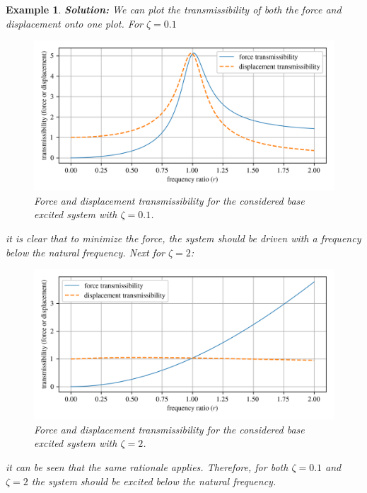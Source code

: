\documentclass[12pt,letter]{article}
\newtheorem{ex}{Example}
\numberwithin{ex}{section} %
\newenvironment{example}{\begin{mdframed}[middlelinewidth=0.5mm]\begin{ex}\normalfont}{\end{ex}\end{mdframed}}
\numberwithin{re}{section} %
\numberwithin{vcs}{section} %
\begin{document}
\begin{example}
					\noindent\textbf{Solution:} We can plot the transmissibility of both the force and displacement onto one plot. For $\zeta=0.1$
					\begin{figure}[H]
						\centering
						\includegraphics[]{../figures/base_excitation_force_and_displacement_transmissibility_1.png}
						\caption{Force and displacement transmissibility for the considered base excited system with $\zeta=0.1$.}
					\end{figure}
					\noindent it is clear that to minimize the force, the system should be driven with a frequency below the natural frequency. Next for  $\zeta=2$:
					\begin{figure}[H]
						\centering
						\includegraphics[]{../figures/base_excitation_force_and_displacement_transmissibility_2.png}
						\caption{Force and displacement transmissibility for the considered base excited system with $\zeta=2$.}
					\end{figure}
					\noindent it can be seen that the same rationale applies. Therefore, for both $\zeta=0.1$ and $\zeta=2$ the system should be excited below the natural frequency.
				
				\end{example}
	
				
							
\end{document}
